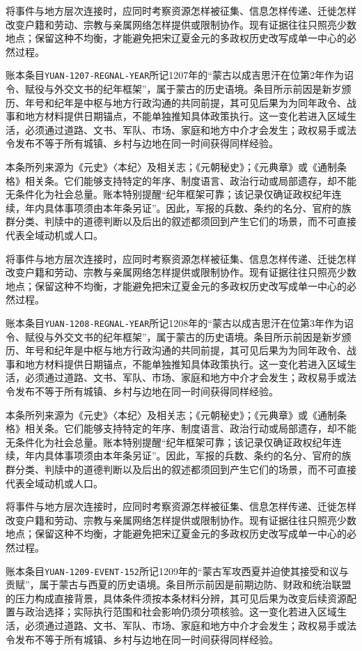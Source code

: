 将事件与地方层次连接时，应同时考察资源怎样被征集、信息怎样传递、迁徙怎样改变户籍和劳动、宗教与亲属网络怎样提供或限制协作。现有证据往往只照亮少数地点；保留这种不均衡，才能避免把宋辽夏金元的多政权历史改写成单一中心的必然过程。

账本条目\texttt{YUAN-1207-REGNAL-YEAR}所记1207年的“蒙古以成吉思汗在位第2年作为诏令、赋役与外交文书的纪年框架”，属于蒙古的历史语境。条目所示前因是新岁颁历、年号和纪年是中枢与地方行政沟通的共同前提，其可见后果为为同年政令、战事和地方材料提供日期锚点，不能单独推知具体政策执行。这一变化若进入区域生活，必须通过道路、文书、军队、市场、家庭和地方中介才会发生；政权易手或法令发布不等于所有城镇、乡村与边地在同一时间获得同样经验。

本条所列来源为《元史》〈本纪〉及相关志；《元朝秘史》；《元典章》或《通制条格》相关条。它们能够支持特定的年序、制度语言、政治行动或局部遗存，却不能无条件化为社会总量。账本特别提醒“纪年框架可靠；该记录仅确证政权纪年连续，年内具体事项须由本年条另证”。因此，军报的兵数、条约的名分、官府的族群分类、判牍中的道德判断以及后出的叙述都须回到产生它们的场景，而不可直接代表全域动机或人口。

将事件与地方层次连接时，应同时考察资源怎样被征集、信息怎样传递、迁徙怎样改变户籍和劳动、宗教与亲属网络怎样提供或限制协作。现有证据往往只照亮少数地点；保留这种不均衡，才能避免把宋辽夏金元的多政权历史改写成单一中心的必然过程。

账本条目\texttt{YUAN-1208-REGNAL-YEAR}所记1208年的“蒙古以成吉思汗在位第3年作为诏令、赋役与外交文书的纪年框架”，属于蒙古的历史语境。条目所示前因是新岁颁历、年号和纪年是中枢与地方行政沟通的共同前提，其可见后果为为同年政令、战事和地方材料提供日期锚点，不能单独推知具体政策执行。这一变化若进入区域生活，必须通过道路、文书、军队、市场、家庭和地方中介才会发生；政权易手或法令发布不等于所有城镇、乡村与边地在同一时间获得同样经验。

本条所列来源为《元史》〈本纪〉及相关志；《元朝秘史》；《元典章》或《通制条格》相关条。它们能够支持特定的年序、制度语言、政治行动或局部遗存，却不能无条件化为社会总量。账本特别提醒“纪年框架可靠；该记录仅确证政权纪年连续，年内具体事项须由本年条另证”。因此，军报的兵数、条约的名分、官府的族群分类、判牍中的道德判断以及后出的叙述都须回到产生它们的场景，而不可直接代表全域动机或人口。

将事件与地方层次连接时，应同时考察资源怎样被征集、信息怎样传递、迁徙怎样改变户籍和劳动、宗教与亲属网络怎样提供或限制协作。现有证据往往只照亮少数地点；保留这种不均衡，才能避免把宋辽夏金元的多政权历史改写成单一中心的必然过程。

账本条目\texttt{YUAN-1209-EVENT-152}所记1209年的“蒙古军攻西夏并迫使其接受和议与贡赋”，属于蒙古与西夏的历史语境。条目所示前因是前期边防、财政和统治联盟的压力构成直接背景，具体条件须按本条材料分辨，其可见后果为改变后续资源配置与政治选择；实际执行范围和社会影响仍须分项核验。这一变化若进入区域生活，必须通过道路、文书、军队、市场、家庭和地方中介才会发生；政权易手或法令发布不等于所有城镇、乡村与边地在同一时间获得同样经验。

